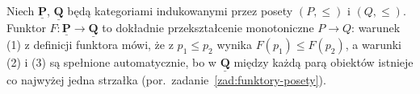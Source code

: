 \begin{przyklad}
Niech $\underline{\mathbf{P}}$, $\underline{\mathbf{Q}}$ będą kategoriami indukowanymi przez posety $(P, \le)$ i $(Q, \le)$. Funktor $F \colon \underline{\mathbf{P}} \to \underline{\mathbf{Q}}$ to dokładnie przekształcenie monotoniczne $P \to Q$: warunek (1) z definicji funktora mówi, że z $p_1 \le p_2$ wynika $F(p_1) \le F(p_2)$, a warunki (2) i (3) są spełnione automatycznie, bo w $\underline{\mathbf{Q}}$ między każdą parą obiektów istnieje co najwyżej jedna strzałka (por.\ zadanie~\ref{zad:funktory-posety}).
\end{przyklad}
